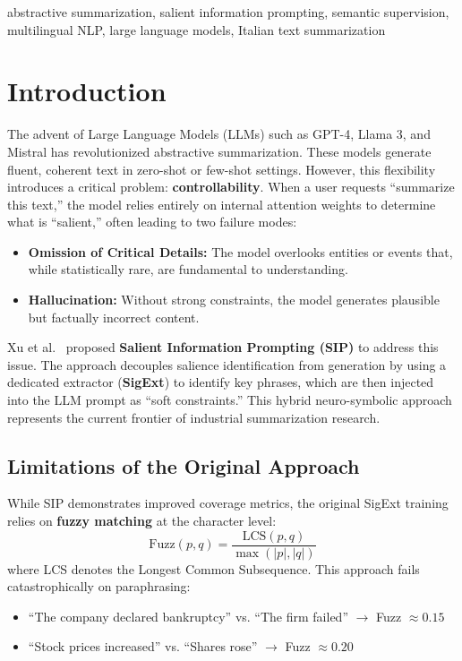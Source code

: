 \documentclass[conference]{IEEEtran}
\begin{document}
\begin{IEEEkeywords}
abstractive summarization, salient information prompting, semantic supervision, multilingual NLP, large language models, Italian text summarization
\end{IEEEkeywords}

\section{Introduction}

The advent of Large Language Models (LLMs) such as GPT-4, Llama 3, and Mistral has revolutionized abstractive summarization. These models generate fluent, coherent text in zero-shot or few-shot settings. However, this flexibility introduces a critical problem: \textbf{controllability}. When a user requests ``summarize this text,'' the model relies entirely on internal attention weights to determine what is ``salient,'' often leading to two failure modes:

\begin{itemize}
    \item \textbf{Omission of Critical Details:} The model overlooks entities or events that, while statistically rare, are fundamental to understanding.
    \item \textbf{Hallucination:} Without strong constraints, the model generates plausible but factually incorrect content.
\end{itemize}

Xu et al.~\cite{xu2024sip} proposed \textbf{Salient Information Prompting (SIP)} to address this issue. The approach decouples salience identification from generation by using a dedicated extractor (\textbf{SigExt}) to identify key phrases, which are then injected into the LLM prompt as ``soft constraints.'' This hybrid neuro-symbolic approach represents the current frontier of industrial summarization research.

\subsection{Limitations of the Original Approach}

While SIP demonstrates improved coverage metrics, the original SigExt training relies on \textbf{fuzzy matching} at the character level:
\begin{equation}
\text{Fuzz}(p, q) = \frac{\text{LCS}(p, q)}{\max(|p|, |q|)}
\label{eq:fuzzy}
\end{equation}
where LCS denotes the Longest Common Subsequence. This approach fails catastrophically on paraphrasing:
\begin{itemize}
    \item ``The company declared bankruptcy'' vs. ``The firm failed'' $\rightarrow$ Fuzz $\approx 0.15$
    \item ``Stock prices increased'' vs. ``Shares rose'' $\rightarrow$ Fuzz $\approx 0.20$
\end{itemize}
\end{document}
